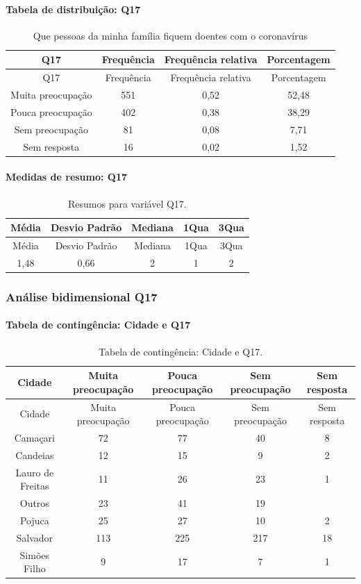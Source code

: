 \documentclass[]{article}
\let\oldparagraph\paragraph
\renewcommand{\paragraph}[1]{\oldparagraph{#1}\mbox{}}
\begin{document}
\hypertarget{tabela-de-distribuiuxe7uxe3o-q17}{%
\paragraph{Tabela de distribuição: Q17}\label{tabela-de-distribuiuxe7uxe3o-q17}}

\begin{longtable}[]{@{}cccc@{}}
\caption{\label{tab:unnamed-chunk-187}Que pessoas da minha família fiquem doentes com o coronavírus}\tabularnewline
\toprule
Q17 & Frequência & Frequência relativa & Porcentagem\tabularnewline
\midrule
\endfirsthead
\toprule
Q17 & Frequência & Frequência relativa & Porcentagem\tabularnewline
\midrule
\endhead
Muita preocupação & 551 & 0,52 & 52,48\tabularnewline
Pouca preocupação & 402 & 0,38 & 38,29\tabularnewline
Sem preocupação & 81 & 0,08 & 7,71\tabularnewline
Sem resposta & 16 & 0,02 & 1,52\tabularnewline
\bottomrule
\end{longtable}

\hypertarget{medidas-de-resumo-q17}{%
\paragraph{Medidas de resumo: Q17}\label{medidas-de-resumo-q17}}

\begin{longtable}[]{@{}ccccc@{}}
\caption{\label{tab:unnamed-chunk-188}Resumos para variável Q17.}\tabularnewline
\toprule
Média & Desvio Padrão & Mediana & 1Qua & 3Qua\tabularnewline
\midrule
\endfirsthead
\toprule
Média & Desvio Padrão & Mediana & 1Qua & 3Qua\tabularnewline
\midrule
\endhead
1,48 & 0,66 & 2 & 1 & 2\tabularnewline
\bottomrule
\end{longtable}

\cleardoublepage

\hypertarget{anuxe1lise-bidimensional-q17}{%
\subsubsection{Análise bidimensional Q17}\label{anuxe1lise-bidimensional-q17}}

\hypertarget{tabela-de-continguxeancia-cidade-e-q17}{%
\paragraph{Tabela de contingência: Cidade e Q17}\label{tabela-de-continguxeancia-cidade-e-q17}}

\begin{longtable}[]{@{}ccccc@{}}
\caption{\label{tab:unnamed-chunk-189}Tabela de contingência: Cidade e Q17.}\tabularnewline
\toprule
Cidade & Muita preocupação & Pouca preocupação & Sem preocupação & Sem resposta\tabularnewline
\midrule
\endfirsthead
\toprule
Cidade & Muita preocupação & Pouca preocupação & Sem preocupação & Sem resposta\tabularnewline
\midrule
\endhead
Camaçari & 72 & 77 & 40 & 8\tabularnewline
Candeias & 12 & 15 & 9 & 2\tabularnewline
Lauro de Freitas & 11 & 26 & 23 & 1\tabularnewline
Outros & 23 & 41 & 19 &\tabularnewline
Pojuca & 25 & 27 & 10 & 2\tabularnewline
Salvador & 113 & 225 & 217 & 18\tabularnewline
Simões Filho & 9 & 17 & 7 & 1\tabularnewline
\bottomrule
\end{longtable}
\end{document}
